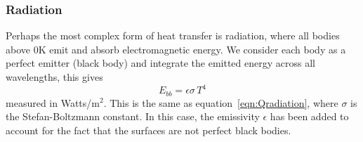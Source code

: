 \subsubsection{Radiation}
Perhaps the most complex form of heat transfer is radiation, where all bodies above 0K emit and absorb electromagnetic energy. We consider each body as a perfect emitter (black body) and integrate the emitted energy across all wavelengths, this gives
\begin{equation}
    E_{bb} = \epsilon\sigma\,T^4
\end{equation}
measured in Watts/m$^2$. This is the same as equation~\ref{eqn:Qradiation}, where $\sigma$ is the Stefan-Boltzmann constant. In this case, the emissivity $\epsilon$ has been added to account for the fact that the surfaces are not perfect black bodies.

\begin{figure}[H]
\end{figure}

